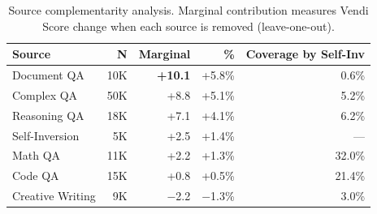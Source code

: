 \begin{table}[t]
\centering
\caption{Source complementarity analysis. Marginal contribution measures Vendi Score change when each source is removed (leave-one-out).}
\label{tab:complementarity}
\small
\begin{tabular}{lrrrr}
\toprule
\textbf{Source} & \textbf{N} & \textbf{Marginal} & \textbf{\%} & \textbf{Coverage by Self-Inv} \\
\midrule
Document QA & 10K & \textbf{+10.1} & +5.8\% & 0.6\% \\
Complex QA & 50K & +8.8 & +5.1\% & 5.2\% \\
Reasoning QA & 18K & +7.1 & +4.1\% & 6.2\% \\
Self-Inversion & 5K & +2.5 & +1.4\% & --- \\
Math QA & 11K & +2.2 & +1.3\% & 32.0\% \\
Code QA & 15K & +0.8 & +0.5\% & 21.4\% \\
Creative Writing & 9K & $-$2.2 & $-$1.3\% & 3.0\% \\
\bottomrule
\end{tabular}
\end{table}
